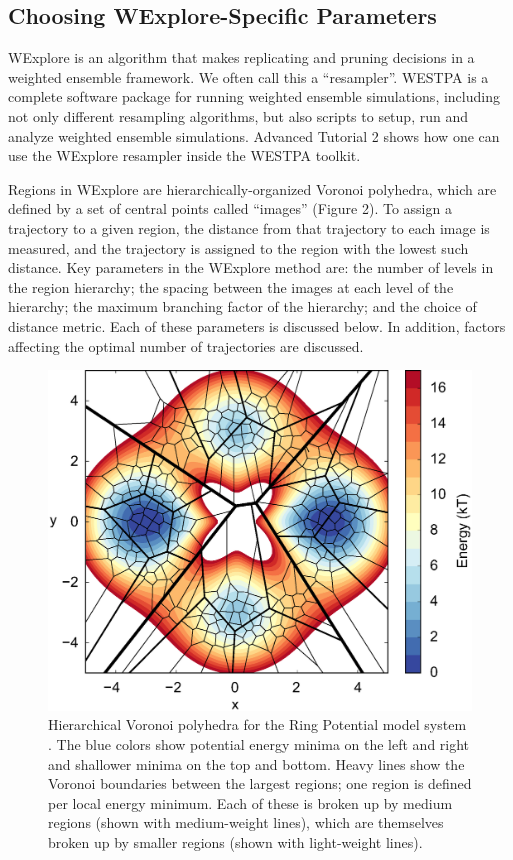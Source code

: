 \documentclass[9pt,tutorial,ASAPversion]{livecoms}
\begin{document}
\subsection{Choosing WExplore-Specific Parameters}

WExplore is an algorithm that makes replicating and pruning decisions in a weighted ensemble framework.  We often call this a “resampler”.  WESTPA is a complete software package for running weighted ensemble simulations, including not only different resampling algorithms, but also scripts to setup, run and analyze weighted ensemble simulations.  Advanced Tutorial 2 shows how one can use the WExplore resampler inside the WESTPA toolkit. 

Regions in WExplore are hierarchically-organized Voronoi polyhedra, which are defined by a set of central points called “images” (Figure 2). 
To assign a trajectory to a given region, the distance from that trajectory to each image is measured, and the trajectory is assigned to the region with the lowest such distance. 
Key parameters in the WExplore method are: the number of levels in the region hierarchy; the spacing between the images at each level of the hierarchy; the maximum branching factor of the hierarchy; and the choice of distance metric. 
Each of these parameters is discussed below. 
In addition, factors affecting the optimal number of trajectories are discussed.

\begin{figure}
\includegraphics[width=\linewidth]{Figure2.eps}
\caption{Hierarchical Voronoi polyhedra for the Ring Potential model system \citep{Dickson2009,Adelman2013}.  
The blue colors show potential energy minima on the left and right and shallower minima on the top and bottom. 
Heavy lines show the Voronoi boundaries between the largest regions; one region is defined per local energy minimum.  
Each of these is broken up by medium regions (shown with medium-weight lines), which are themselves broken up by smaller regions (shown with light-weight lines).}
\label{fig:view}
\end{figure}
\end{document}
